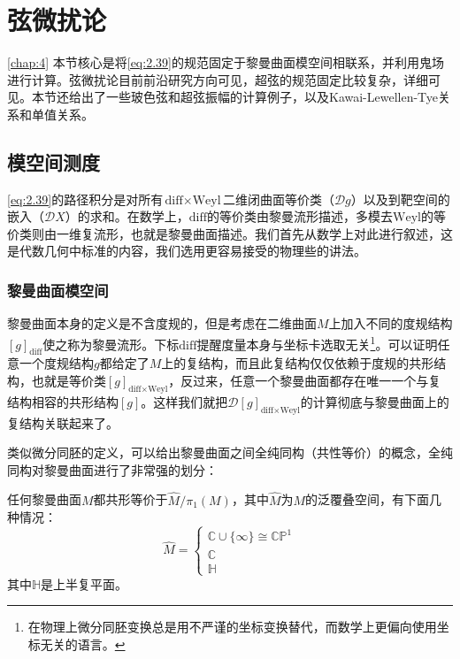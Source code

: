 \chapter{弦微扰论}
\ref{chap:4}
\label{chap:4}
本节核心是将\ref{eq:2.39}的规范固定于黎曼曲面模空间相联系，并利用鬼场进行计算。弦微扰论目前前沿研究方向可见\cite{berkovits2022snowmasswhitepaperstring}，超弦的规范固定比较复杂，详细可见\cite{Witten:2012bh}。本节还给出了一些玻色弦和超弦振幅的计算例子，以及Kawai-Lewellen-Tye关系\cite{Kawai:1985xq}和单值关系\cite{Bjerrum-Bohr:2009ulz}。

\section{模空间测度}
\ref{eq:2.39}的路径积分是对所有$\text{diff}\times\text{Weyl}$二维闭曲面等价类（$\mathcal{D}g$）以及到靶空间的嵌入（$\mathcal{D}X$）的求和。在数学上，$\text{diff}$的等价类由黎曼流形描述，多模去$\text{Weyl}$的等价类则由一维复流形，也就是黎曼曲面描述。我们首先从数学上对此进行叙述，这是代数几何中标准的内容\cite{forster2012lectures,schlichenmaier2010introduction,griffiths2014principles}，我们选用更容易接受的物理些的讲法\cite{Giacchetto:2024aka,Staessens:2010vi}。
\subsection{黎曼曲面模空间}
黎曼曲面本身的定义是不含度规的，但是考虑在二维曲面$M$上加入不同的度规结构$[g]_{\text{diff}}$使之称为黎曼流形。下标$\text{diff}$提醒度量本身与坐标卡选取无关\footnote{在物理上微分同胚变换总是用不严谨的坐标变换替代，而数学上更偏向使用坐标无关的语言。}。可以证明任意一个度规结构$g$都给定了$M$上的复结构，而且此复结构仅仅依赖于度规的共形结构，也就是等价类$[g]_{\text{diff}\times\text{Weyl}}$，反过来，任意一个黎曼曲面都存在唯一一个与复结构相容的共形结构$[g]$。这样我们就把${\mathcal{D}[g]_{\text{diff}\times\text{Weyl}}}$的计算彻底与黎曼曲面上的复结构关联起来了。

类似微分同胚的定义，可以给出黎曼曲面之间全纯同构（共性等价）的概念，全纯同构对黎曼曲面进行了非常强的划分：

\begin{boxedtext}[单值化定理]
任何黎曼曲面$M$都共形等价于$\hat{M}/\pi_1(M)$，其中$\hat{M}$为$M$的泛覆叠空间，有下面几种情况：
\begin{equation*}
	\hat{M}=\left\{\begin{array}{c}\mathbb{C}\cup\{\infty\}\cong\mathbb{CP}^1\\\mathbb{C}\\\mathbb{H}\end{array}\right.
\end{equation*}
其中$\mathbb{H}$是上半复平面。
\end{boxedtext}

